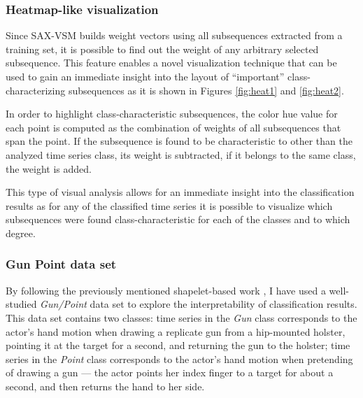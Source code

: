 \subsubsection{Heatmap-like visualization}
Since SAX-VSM builds \tfidf weight vectors using all subsequences extracted from a
training set, it is possible to find out the weight of any arbitrary selected subsequence.
This feature enables a novel visualization technique that can be used to gain an immediate
insight into the layout of ``important'' class-characterizing subsequences as it is shown in Figures
\ref{fig:heat1} and \ref{fig:heat2}.

In order to highlight class-characteristic subsequences, the color hue value for each point is computed as the combination of 
\tfidf weights of all subsequences that span the point. If the subsequence is found to be characteristic to other than the 
analyzed time series class, its weight is subtracted, if it belongs to the same class, the weight is added. 

This type of visual analysis allows for an immediate insight into the classification results as for any of the classified 
time series it is possible to visualize which subsequences were found class-characteristic for each of the classes and to 
which degree.

\subsubsection{Gun Point data set}
By following the previously mentioned shapelet-based work \cite{citeulike:7344347} \cite{citeulike:11345338}, 
I have used a well-studied \textit{\mbox{Gun/Point}} data set \cite{Ratanamahatana04makingtime-series} to explore the 
interpretability of classification results. This data set contains two classes: 
time series in the \textit{Gun} class corresponds to the actor's hand motion when drawing
a replicate gun from a hip-mounted holster, pointing it at the target for a second, and returning the gun to the holster; 
time series in the \textit{Point} class corresponds to the actor's hand motion when pretending
of drawing a gun --- the actor points her index finger to a target for about a second, and then returns the 
hand to her side. 

